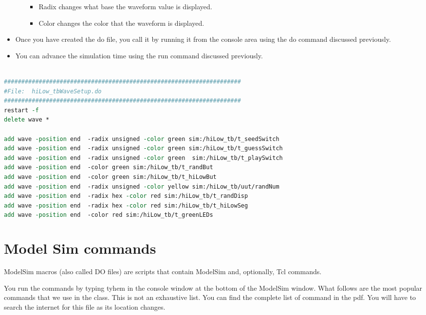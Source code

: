 \begin{itemize}
\begin{itemize}
    \begin{itemize}
    \item
      Radix changes what base the waveform value is displayed.
    \item
      Color changes the color that the waveform is displayed.
    \end{itemize}
  \end{itemize}
\item
  Once you have created the do file, you call it by running it from the
  console area using the do command discussed previously.
\item
  You can advance the simulation time using the run command discussed
  previously.
\end{itemize}



\begin{lstlisting}[language=tcl,  
caption={do file for  hiLow\_tb.},  
label={listing:howToDoFile},
basicstyle=\tiny,
frame=single]
 
####################################################################
#File:	hiLow_tbWaveSetup.do
####################################################################
restart -f
delete wave *

add wave -position end  -radix unsigned -color green sim:/hiLow_tb/t_seedSwitch
add wave -position end  -radix unsigned -color green sim:/hiLow_tb/t_guessSwitch
add wave -position end  -radix unsigned -color green  sim:/hiLow_tb/t_playSwitch
add wave -position end  -color green sim:/hiLow_tb/t_randBut
add wave -position end  -color green sim:/hiLow_tb/t_hiLowBut
add wave -position end  -radix unsigned -color yellow sim:/hiLow_tb/uut/randNum
add wave -position end  -radix hex -color red sim:/hiLow_tb/t_randDisp
add wave -position end  -radix hex -color red sim:/hiLow_tb/t_hiLowSeg
add wave -position end  -color red sim:/hiLow_tb/t_greenLEDs

    \end{lstlisting}

\section{Model Sim commands}
ModelSim macros (also called DO files) are scripts that contain ModelSim and, optionally, Tcl commands.

You run the commands by typing tyhem in the console window at the bottom of the ModelSim window.
What follows are the most popular commands that we use in the class.  This is not an exhaustive list.
You can find the complete list of command in the 
 pdf.  You will have to search
the internet for this file as its location changes.  

